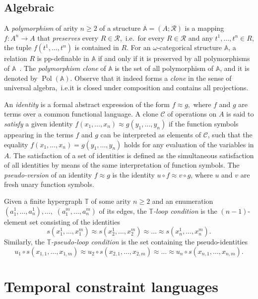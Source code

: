 \documentclass[a4paper,reqno, cleveref]{amsart}
\DeclareMathOperator{\Pol}{Pol}
\newcommand{\sA}{\mathbb A}
\newcommand{\sT}{\mathbb T}
\newcommand{\clone}[1]{\mathcal{#1}}
\begin{document}
\subsection{Algebraic}\label{sect:algebraic}
A \emph{polymorphism} of arity $n \geq 2$ of a structure $\sA=(A;\mathcal R)$ is a mapping $f:A^n \to A$ that \emph{preserves} every $R\in \mathcal{R}$,~i.e.~for every $R \in \mathcal{R}$ and any $t^1, \dots, t^n \in R$, the tuple $f(t^1, \dots, t^n)$ is contained in $R$. 
%
For an $\omega$-categorical structure $\sA$, a relation $R$ is pp-definable in $\sA$ if and only if it is preserved by all polymorphisms of $\sA$~\cite{BodirskyNesetrilJLC}.
The \emph{polymorphism clone} of $\sA$ is the set of all polymorphism of $\sA$, and it is denoted by $\Pol(\sA)$. Observe that it indeed forms a \emph{clone} in the sense of universal algebra,~i.e.\;it is closed under composition and contains all projections.

An \emph{identity} is a formal abstract expression of the form $f \approx g,$ where $f$ and $g$ are terms over a common functional language. 
A clone $\clone C$ of operations on $A$ is said to \emph{satisfy} a given identity $f(x_1, \dots, x_n) \approx g(y_1, \dots, y_n)$ if the function symbols appearing in the terms $f$ and $g$ can be interpreted as elements of $\clone C$, such that the equality $f(x_1, \dots, x_n)=g(y_1, \dots, y_n)$ holds for any evaluation of the variables in $A$.
%
The satisfaction of a set of identities is defined as the simultaneous satisfaction of all identities by means of the same interpretation of function symbols.
%
The \emph{pseudo-version} of an identity  $f\approx g$  is the identity $u\circ f\approx v\circ g$, where $u$ and $v$ are fresh unary function symbols.

Given a finite hypergraph  $\sT$ of some arity $n\geq 2$ and an enumeration $(a^1_{1}, \dots, a^1_{n} ), \dots,$ $ (a^m_{1}, \dots, a^m_{n} )$ %
of its edges,  the \emph{$\sT$-loop condition} is the $(n-1)$-element set consisting of the  identities 
\[s(x^1_{1}, \dots, x^m_{1}  ) \approx s(x^1_{ 2}, \dots, x^m_{2}  ) \approx \dots \approx s(x^1_{n}, \dots, x^m_{n} ).\]
 Similarly, the \emph{$\sT$-pseudo-loop condition} is the set containing the pseudo-identities 
  \[u_1 \circ s(x_{1, 1}, \dots, x_{1, m}  ) \approx u_2 \circ s(x_{2, 1}, \dots, x_{2, m}  ) \approx \dots \approx u_n \circ s(x_{n, 1}, \dots, x_{n, m} ).\]

\section{Temporal constraint languages}\label{section:temporal}
\end{document}
